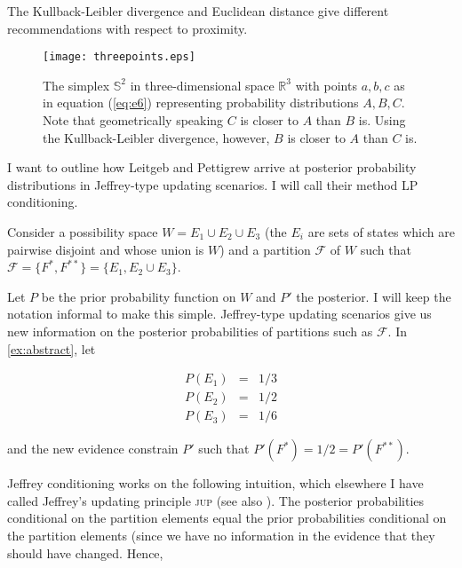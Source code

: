 \documentclass[11pt]{article}
\begin{document}
The Kullback-Leibler divergence and Euclidean distance give different
re\-commendations with respect to proximity.

\begin{figure}[ht]
  \begin{flushright}
    \begin{minipage}[h]{.7\linewidth}
      \texttt{[image: threepoints.eps]}
      \caption{\footnotesize The simplex $\mathbb{S}^{2}$ in
        three-dimensional space $\mathbb{R}^{3}$ with points $a,b,c$
        as in equation (\ref{eq:e6}) representing probability
        distributions $A,B,C$. Note that geometrically speaking $C$ is
        closer to $A$ than $B$ is. Using the Kullback-Leibler
        divergence, however, $B$ is closer to $A$ than $C$ is.}
      \label{fig:threepoints}
    \end{minipage}
  \end{flushright}
\end{figure}

I want to outline how Leitgeb and Pettigrew arrive at posterior
probability distributions in Jeffrey-type updating scenarios. I will
call their method LP conditioning.

\begin{quotex}
  \label{ex:abstract} Consider a possibility
  space $W=E_{1}\cup{}E_{2}\cup{}E_{3}$ (the $E_{i}$ are sets of
  states which are pairwise disjoint and whose union is $W$) and a
  partition $\mathcal{F}$ of $W$ such that
  $\mathcal{F}=\{F^{*},F^{**}\}=\{E_{1},E_{2}\cup{}E_{3}\}$.
\end{quotex}

Let $P$ be the prior probability function on $W$ and $P'$ the
posterior. I will keep the notation informal to make this simple.
Jeffrey-type updating scenarios give us new information on the
posterior probabilities of partitions such as $\mathcal{F}$. In
{\xample} \ref{ex:abstract}, let

\begin{equation}
  \label{eq:priors}
  \begin{array}{rcl}
    P(E_{1})&=&1/3 \\
    P(E_{2})&=&1/2 \\
    P(E_{3})&=&1/6
  \end{array}
\end{equation}

and the new evidence constrain $P'$ such that
$P'(F^{*})=1/2=P'(F^{**})$.

Jeffrey conditioning works on the following intuition, which elsewhere
I have called Jeffrey's updating principle \textsc{jup} (see also
). The posterior probabilities conditional on the
partition elements equal the prior probabilities conditional on the
partition elements (since we have no information in the evidence that
they should have changed. Hence,
\end{document}
